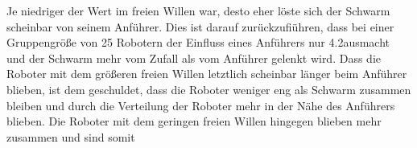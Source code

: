 Je niedriger der Wert im freien Willen war, desto eher löste sich der Schwarm scheinbar von seinem Anführer. Dies ist darauf zurückzufiühren, dass bei einer Gruppengröße von 25 Robotern der Einfluss eines Anführers nur 4.2\per ausmacht und der Schwarm mehr vom Zufall als vom Anführer gelenkt wird. Dass die Roboter mit dem größeren freien Willen letztlich scheinbar länger beim Anführer blieben, ist dem geschuldet, dass die Roboter weniger eng als Schwarm zusammen bleiben und durch die Verteilung der Roboter mehr in der Nähe des Anführers blieben. Die Roboter mit dem geringen freien Willen hingegen blieben mehr zusammen und sind somit 
%
%
%
%
%
